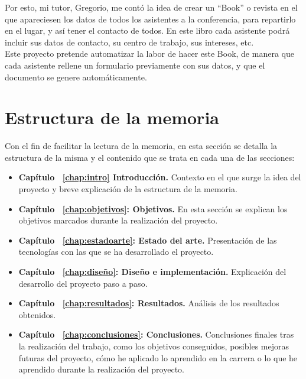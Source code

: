 \documentclass[a4paper, 12pt]{book}
\begin{document}
Por esto, mi tutor, Gregorio, me contó la idea de crear un ``Book'' o revista en el que apareciesen los datos de todos los asistentes a la conferencia, para repartirlo en el lugar, y así tener el contacto de todos. En este libro cada asistente podrá incluir sus datos de contacto, su centro de trabajo, sus intereses, etc.\\

Este proyecto pretende automatizar la labor de hacer este Book, de manera que cada asistente rellene un formulario previamente con sus datos, y que el documento se genere automáticamente.


\section{Estructura de la memoria}
\label{sec:estructura}
Con el fin de facilitar la lectura de la memoria, en esta sección se detalla la estructura de la misma y el contenido que se trata en cada una de las secciones:
\begin{itemize}
  \item \textbf{Capítulo ~\ref{chap:intro} Introducción.} Contexto en el que surge la idea del proyecto y breve explicación de la estructura de la memoria.

  \item \textbf{Capítulo ~\ref{chap:objetivos}: Objetivos.} En esta sección se explican los objetivos marcados durante la realización del proyecto.

  \item \textbf{Capítulo ~\ref{chap:estadoarte}: Estado del arte.} Presentación de las tecnologías con las que se ha desarrollado el proyecto.
  
  \item \textbf{Capítulo ~\ref{chap:diseño}: Diseño e implementación.} Explicación del desarrollo del proyecto paso a paso.

  \item \textbf{Capítulo ~\ref{chap:resultados}: Resultados.} Análisis de los resultados obtenidos.
  
  \item \textbf{Capítulo ~\ref{chap:conclusiones}: Conclusiones.} Conclusiones finales tras la realización del trabajo, como los objetivos conseguidos, posibles mejoras futuras del proyecto, cómo he aplicado lo aprendido en la carrera o lo que he aprendido durante la realización del proyecto.
\end{itemize}
\end{document}
